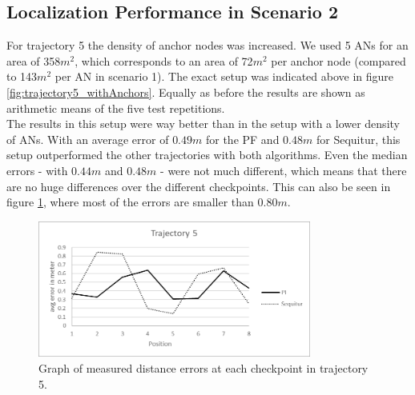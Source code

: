 \subsection{Localization Performance in Scenario 2}
For trajectory 5 the density of anchor nodes was increased. We used 5 ANs for an area of 358$m^2$, which corresponds to an area of 72$m^2$ per anchor node (compared to 143$m^2$ per AN in scenario 1). The exact setup was indicated above in figure \ref{fig:trajectory5_withAnchors}. Equally as before the results are shown as arithmetic means of the five test repetitions.\\
\noindent\hspace*{5mm}%
The results in this setup were way better than in the setup with a lower density of ANs. With an average error of $0.49m$ for the PF and $0.48m$ for Sequitur, this setup outperformed the other trajectories with both algorithms. Even the median errors - with $0.44m$ and $0.48m$ -  were not much different, which means that there are no huge differences over the different checkpoints. This can also be seen in figure \ref{fig:trajectory5_results}, where most of the errors are smaller than $0.80m$.

\begin{figure}[th]
\centering
\includegraphics[width=0.8\textwidth]{Figures/trajectory5_results}
\decoRule
\caption[Positioning Results Trajectory 5]{Graph of measured distance errors at each checkpoint in trajectory 5.}
\label{fig:trajectory5_results}
\end{figure}


